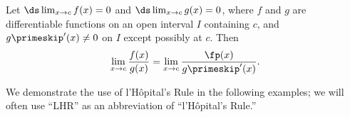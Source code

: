 {Let $\ds \lim_{x\to c}f(x) = 0$ and $\ds \lim_{x\to c}g(x)=0$, where $f$ and $g$ are differentiable functions on an open interval $I$ containing $c$, and $g\primeskip'(x)\neq 0$ on $I$ except possibly at $c$. Then 
$$ \lim_{x\to c} \frac{f(x)}{g(x)} = \lim_{x\to c} \frac{\fp(x)}{g\primeskip'(x)}.$$
}

We demonstrate the use of l'H\^opital's Rule in the following examples; we will often use ``LHR'' as an abbreviation of ``l'H\^opital's Rule.''\\

{}
